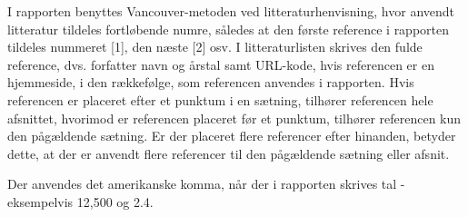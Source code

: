 I rapporten benyttes Vancouver-metoden ved litteraturhenvisning, hvor anvendt litteratur tildeles fortløbende numre, således at den første reference i rapporten tildeles nummeret [1], den næste [2] osv. I litteraturlisten skrives den fulde reference, dvs. forfatter navn og årstal samt URL-kode, hvis referencen er en hjemmeside, i den rækkefølge, som referencen anvendes i rapporten. Hvis referencen er placeret efter et punktum i en sætning, tilhører referencen hele afsnittet, hvorimod er referencen placeret før et punktum, tilhører referencen kun den pågældende sætning. Er der placeret flere referencer efter hinanden, betyder dette, at der er anvendt flere referencer til den pågældende sætning eller afsnit. 

Der anvendes det amerikanske komma, når der i rapporten skrives tal - eksempelvis 12,500 og 2.4.%

